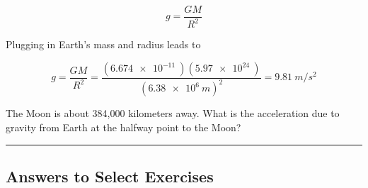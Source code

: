 \documentclass[dvipsnames]{article}
\numberwithin{equation}{section}
\numberwithin{figure}{section}
\begin{document}
\begin{equation}
    g = \frac{GM}{R^2}
\end{equation}


Plugging in Earth's mass and radius leads to 

\begin{equation*} 
    g = \frac{GM}{R^2} = \frac{\left(\SI{6.674e-11}{}\right)\left(\SI{5.97e24}{}\right)}{\left(\SI{6.38e6}{m}\right)^2} = \SI{9.81}{m/s^2}
\end{equation*}




\begin{exercise} \label{knMwSV}
The Moon is about 384,000 kilometers away. What is the acceleration due to gravity from Earth at the halfway point to the Moon? 
\end{exercise}

\hrule







\clearpage
\printnoidxglossaries


\clearpage
\subsection{Answers to Select Exercises}
\end{document}
